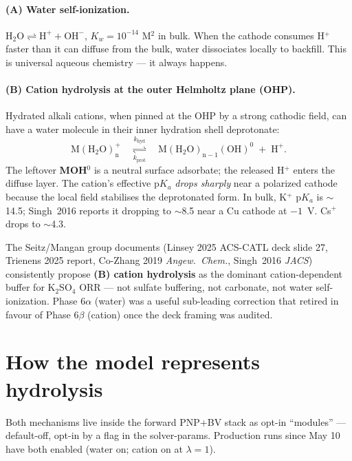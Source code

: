 \documentclass[11pt]{article}
\begin{document}
\paragraph{(A) Water self-ionization.}
$\mathrm{H_2O \rightleftharpoons H^+ + OH^-}$, $K_w = 10^{-14}$ M$^2$
in bulk.  When the cathode consumes H$^+$ faster than it can diffuse
from the bulk, water dissociates locally to backfill.  This is
universal aqueous chemistry --- it always happens.

\paragraph{(B) Cation hydrolysis at the outer Helmholtz plane (OHP).}
Hydrated alkali cations, when pinned at the OHP by a strong cathodic
field, can have a water molecule in their inner hydration shell
deprotonate:
\[
\mathrm{M(H_2O)_n^+}
\quad
\underset{k_{\mathrm{prot}}}{\overset{k_{\mathrm{hyd}}}{\rightleftharpoons}}
\quad
\mathrm{M(H_2O)_{n-1}(OH)^0} \;+\; \mathrm{H^+}.
\]
The leftover \textbf{MOH$^0$} is a neutral surface adsorbate; the
released H$^+$ enters the diffuse layer.  The cation's effective
$\mathrm{p}K_a$ \emph{drops sharply} near a polarized cathode because
the local field stabilises the deprotonated form.  In bulk, K$^+$
$\mathrm{p}K_a$ is $\sim$14.5; Singh~2016 reports it dropping to
$\sim$8.5 near a Cu cathode at $-1$~V.  Cs$^+$ drops to $\sim$4.3.

\begin{infobox}
The Seitz/Mangan group documents (Linsey 2025 ACS-CATL deck slide 27,
Trienens 2025 report, Co-Zhang 2019 \emph{Angew.~Chem.}, Singh~2016
\emph{JACS}) consistently propose \textbf{(B) cation hydrolysis} as
the dominant cation-dependent buffer for K$_2$SO$_4$ ORR --- not
sulfate buffering, not carbonate, not water self-ionization.  Phase
6$\alpha$ (water) was a useful sub-leading correction that retired
in favour of Phase 6$\beta$ (cation) once the deck framing was
audited.
\end{infobox}

\section{How the model represents hydrolysis}
\label{sec:model}

Both mechanisms live inside the forward PNP+BV stack as opt-in
``modules'' --- default-off, opt-in by a flag in the solver-params.
Production runs since May 10 have both enabled (water on; cation
on at $\lambda=1$).
\end{document}
